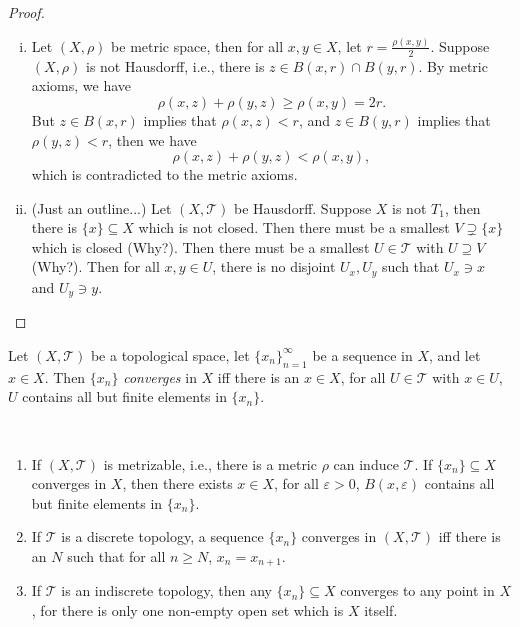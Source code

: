 \begin{proof} \
	\begin{enumerate} [(i)]
		\item Let $(X, \rho)$ be metric space, then for all $x, y \in X$, let $r = \frac{\rho(x,y)}{2}$. Suppose $(X, \rho)$ is not Hausdorff, i.e., there is $z \in B(x, r) \cap B(y, r)$. By metric axioms, we have
			$$
			\rho(x, z) + \rho(y, z) \ge \rho (x,y) = 2r.
			$$
			But $z \in B(x, r)$ implies that $\rho(x,z) < r$, and $z \in B(y, r)$ implies that $\rho(y,z) < r$, then we have
			$$
			\rho(x, z) + \rho(y, z) < \rho(x,y),
			$$
			which is contradicted to the metric axioms.
			
		\item (Just an outline...) Let $(X, \mathcal T)$ be Hausdorff. Suppose $X$ is not $T_1$, then there is $\{x\} \subseteq X$ which is not closed. Then there must be a smallest $V \supsetneq \{x\}$ which is closed (Why?). Then there must be a smallest $U \in \mathcal T$ with $U \supseteq V$ (Why?). Then for all $x, y \in U$, there is no disjoint $U_x, U_y$ such that $U_x \ni x$ and $U_y \ni y$.
	\end{enumerate}
\end{proof}


\begin{definition}
	Let $(X, \mathcal T)$ be a topological space, let $\{x_n\}_{n = 1}^\infty$ be a sequence in $X$, and let $x \in X$. Then $\{x_n\}$ \textit{converges} in $X$ iff there is an $x \in X$, for all $U \in \mathcal T$ with $x \in U$, $U$ contains all but finite elements in $\{x_n\}$.
\end{definition}


\begin{note} \
	\begin{enumerate}
		\item If $(X, \mathcal T)$ is metrizable, i.e., there is a metric $\rho$ can induce $\mathcal T$. If $\{x_n\} \subseteq X$ converges in $X$, then there exists $x \in X$, for all $\varepsilon > 0$, $B(x, \varepsilon)$ contains all but finite elements in $\{x_n\}$.
		\item If $\mathcal T$ is a discrete topology, a sequence $\{x_n\}$ converges in $(X, \mathcal T)$ iff there is an $N$ such that for all $n \ge N$, $x_n = x_{n + 1}$.
		\item If $\mathcal T$ is an indiscrete topology, then any $\{x_n\} \subseteq X$ converges to any point in $X$, for there is only one non-empty open set which is $X$ itself.
	\end{enumerate}
\end{note}


